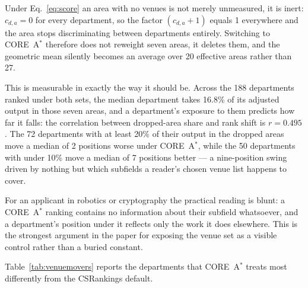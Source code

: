 \documentclass[11pt]{article}
\newcommand{\csr}{CSRankings}
\begin{document}
Under Eq.~\ref{eq:score} an area with no venues is not merely unmeasured, it is
inert: $c_{d,a} = 0$ for every department, so the factor $(c_{d,a}+1)$ equals 1
everywhere and the area stops discriminating between departments entirely.
Switching to CORE~A$^*$ therefore does not reweight seven areas, it deletes
them, and the geometric mean silently becomes an average over 20 effective
areas rather than 27.

This is measurable in exactly the way it should be. Across the 188 departments
ranked under both sets, the median department takes 16.8\% of its adjusted
output in those seven areas, and a department's exposure to them predicts how
far it falls: the correlation between dropped-area share and rank shift is
$r = 0.495$. The 72 departments with at least 20\% of their output in the
dropped areas move a median of 2 positions worse under CORE~A$^*$, while the 50
departments with under 10\% move a median of 7 positions better --- a
nine-position swing driven by nothing but which subfields a reader's chosen
venue list happens to cover.

For an applicant in robotics or cryptography the practical reading is blunt: a
CORE~A$^*$ ranking contains no information about their subfield whatsoever, and
a department's position under it reflects only the work it does elsewhere.
This is the strongest argument in the paper for exposing the venue set as a
visible control rather than a buried constant.

Table~\ref{tab:venuemovers} reports the departments that CORE~A$^*$ treats most
differently from the \csr{} default.
\end{document}
